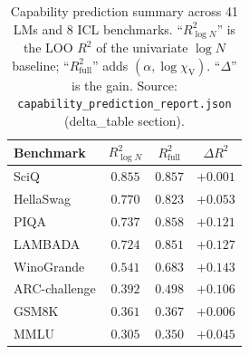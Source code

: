 \documentclass[11pt,a4paper]{article}
\begin{document}
\begin{table}[h]
\centering
\small
\caption{Capability prediction summary across 41 LMs and 8 ICL
benchmarks. ``$R^2_{\log N}$'' is the LOO $R^2$ of the univariate
$\log N$ baseline; ``$R^2_\mathrm{full}$'' adds
$(\alpha, \log\chi_\mathrm{V})$. ``$\Delta$'' is the gain.
Source: \texttt{capability\_prediction\_report.json} (delta\_table
section).}
\label{tab:S14}
\begin{tabular}{lccc}
\toprule
Benchmark & $R^2_{\log N}$ & $R^2_\mathrm{full}$ & $\Delta R^2$ \\
\midrule
SciQ          & $0.855$ & $0.857$ & $+0.001$ \\
HellaSwag     & $0.770$ & $0.823$ & $+0.053$ \\
PIQA          & $0.737$ & $0.858$ & $+0.121$ \\
LAMBADA       & $0.724$ & $0.851$ & $+0.127$ \\
WinoGrande    & $0.541$ & $0.683$ & $+0.143$ \\
ARC-challenge & $0.392$ & $0.498$ & $+0.106$ \\
GSM8K         & $0.361$ & $0.367$ & $+0.006$ \\
MMLU          & $0.305$ & $0.350$ & $+0.045$ \\
\bottomrule
\end{tabular}
\end{table}


\end{document}
